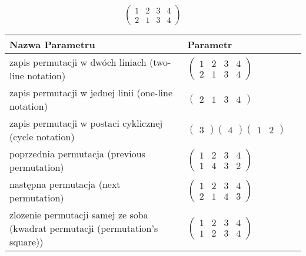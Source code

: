 \documentclass[12pt]{article}
\begin{document}
\subsection{}
\begin{center}
\[
\begin{pmatrix}
	1 & 2 & 3 & 4 \\ 
	2 & 1 & 3 & 4 
\end{pmatrix}
\]

\begin{tabular}{|m{0.6\linewidth}|m{0.4\linewidth}|}
	\hline
	Nazwa Parametru & Parametr \\
	\hline
	zapis permutacji w dwóch liniach (two-line notation) & $\begin{pmatrix} 1 & 2 & 3 & 4 \\ 
2 & 1 & 3 & 4 \end{pmatrix}$ \\ 
	\hline
	zapis permutacji w jednej linii (one-line notation) & $\begin{pmatrix} 2 & 1 & 3 & 4 \end{pmatrix}$ \\ 
	\hline
	zapis permutacji w postaci cyklicznej (cycle notation) & $\begin{pmatrix} 3 \end{pmatrix} \begin{pmatrix} 4 \end{pmatrix} \begin{pmatrix} 1 & 2 \end{pmatrix} $ \\ 
	\hline
	poprzednia permutacja (previous permutation) & $\begin{pmatrix} 1 & 2 & 3 & 4 \\ 
1 & 4 & 3 & 2 \end{pmatrix}$ \\ 
	\hline
	następna permutacja (next permutation) & $\begin{pmatrix} 1 & 2 & 3 & 4 \\ 
2 & 1 & 4 & 3 \end{pmatrix}$ \\ 
	\hline
	zlozenie permutacji samej ze soba (kwadrat permutacji (permutation's square)) & $\begin{pmatrix} 1 & 2 & 3 & 4 \\ 
1 & 2 & 3 & 4 \end{pmatrix}$ \\ 
	\hline
\end{tabular}
\end{center}
\end{document}
